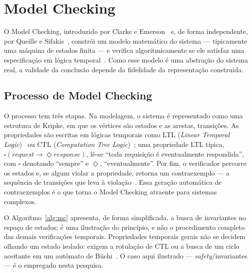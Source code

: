 \section{Model Checking}

O Model Checking, introduzido por Clarke e Emerson~\cite{Clarke1981} e, de forma
independente, por Queille e Sifakis~\cite{Queille1982}, constrói um modelo
matemático do sistema --- tipicamente uma máquina de estados finita --- e
verifica algoritmicamente se ele satisfaz uma especificação em lógica
temporal~\cite{Clarke1986}. Como esse modelo é uma abstração do sistema real, a
validade da conclusão depende da fidelidade da representação construída.

\subsection{Processo de Model Checking}

O processo tem três etapas. Na modelagem, o sistema é representado como uma
estrutura de Kripke, em que os vértices são estados e as arestas, transições. As
propriedades são escritas em lógicas temporais como LTL (\textit{Linear Temporal
Logic})~\cite{Pnueli1977} ou CTL (\textit{Computation Tree Logic})~\cite{Clarke1986};
uma propriedade LTL típica, $\square(\textit{request} \rightarrow
\Diamond\textit{response})$, lê-se ``toda requisição é eventualmente
respondida'', com $\square$ denotando ``sempre'' e $\Diamond$, ``eventualmente''.
Por fim, o verificador percorre os estados e, se algum violar a propriedade,
retorna um contraexemplo --- a sequência de transições que leva à
violação~\cite{Clarke1986}. Essa geração automática de contraexemplos é o que
torna o Model Checking atraente para sistemas complexos.

O Algoritmo~\ref{alg:mc} apresenta, de forma simplificada, a busca de invariantes
no espaço de estados; é uma ilustração do princípio, e não o procedimento
completo das demais verificações temporais. Propriedades temporais gerais não se
decidem olhando um estado isolado: exigem a rotulação de CTL ou a busca de um
ciclo aceitante em um autômato de Büchi~\cite{Clarke1986}. O caso aqui ilustrado
--- \textit{safety}/invariantes --- é o empregado nesta pesquisa.

